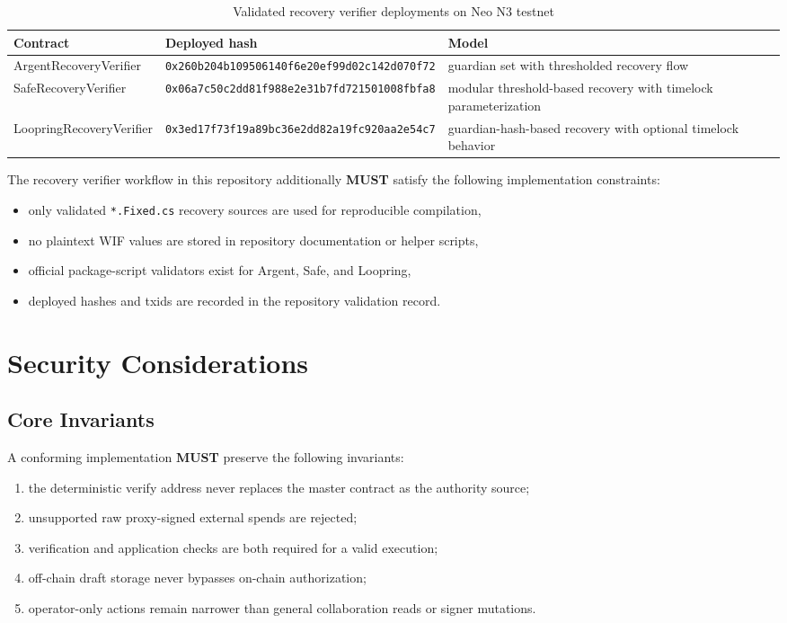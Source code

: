 \documentclass[11pt]{article}
\newcommand{\code}[1]{\texttt{#1}}
\newcommand{\must}{\textbf{MUST}}
\begin{document}
\begin{table}[h!]
  \centering
  \caption{Validated recovery verifier deployments on Neo N3 testnet}
  \begin{tabularx}{\textwidth}{>{\raggedright\arraybackslash}p{}>{\raggedright\arraybackslash}p{}X}
    \toprule
    Contract & Deployed hash & Model \\
    \midrule
    ArgentRecoveryVerifier & \code{0x260b204b109506140f6e20ef99d02c142d070f72} & guardian set with thresholded recovery flow \\
    SafeRecoveryVerifier & \code{0x06a7c50c2dd81f988e2e31b7fd721501008fbfa8} & modular threshold-based recovery with timelock parameterization \\
    LoopringRecoveryVerifier & \code{0x3ed17f73f19a89bc36e2dd82a19fc920aa2e54c7} & guardian-hash-based recovery with optional timelock behavior \\
    \bottomrule
  \end{tabularx}
\end{table}

The recovery verifier workflow in this repository additionally \must{} satisfy the following implementation constraints:
\begin{itemize}
  \item only validated \code{*.Fixed.cs} recovery sources are used for reproducible compilation,
  \item no plaintext WIF values are stored in repository documentation or helper scripts,
  \item official package-script validators exist for Argent, Safe, and Loopring,
  \item deployed hashes and txids are recorded in the repository validation record.
\end{itemize}

\section{Security Considerations}
\subsection{Core Invariants}
A conforming implementation \must{} preserve the following invariants:
\begin{enumerate}
  \item the deterministic verify address never replaces the master contract as the authority source;
  \item unsupported raw proxy-signed external spends are rejected;
  \item verification and application checks are both required for a valid execution;
  \item off-chain draft storage never bypasses on-chain authorization;
  \item operator-only actions remain narrower than general collaboration reads or signer mutations.
\end{enumerate}
\end{document}
